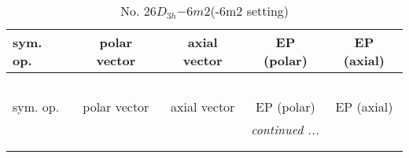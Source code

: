 \documentclass[fleqn,10pt,landscape]{jsarticle}
\begin{document}
\newpage
\begin{center}
\renewcommand{\arraystretch}{1.3}
\begin{longtable}{lcccc}
\caption{No. 26\quad$D_{3h}$\quad$-6m2$\quad(-6m2 setting)\quad[ hexagonal ]}
 \\
 \hline \hline
sym. op. & polar vector & axial vector & EP (polar) & EP (axial) \\ \hline \endfirsthead

\multicolumn{4}{l}{\tablename\ \thetable{}} \\
 \hline \hline
sym. op. & polar vector & axial vector & EP (polar) & EP (axial) \\ \hline \endhead

 \hline \hline
\multicolumn{4}{r}{\footnotesize\it continued ...} \\ \endfoot

 \hline \hline
\multicolumn{4}{r}{} \\ \endlastfoot


\end{longtable}
\end{center}
\end{document}
